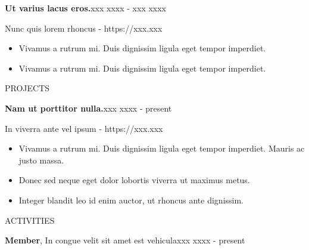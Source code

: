 \documentclass{article}
\newcommand{\itemSectionSpace}{\vspace{0.2in}}
\newcommand{\sectionSpace}{\vspace{0.3in}}
\begin{document}
\itemSectionSpace

\begin{minipage}[t]{0.125\linewidth}
\uppercase{}
\end{minipage}%
\hfill
\begin{minipage}[t]{0.85\linewidth}
\textbf{Ut varius lacus eros.}\hfill xxx xxxx - xxx xxxx

 Nunc quis lorem rhoncus - https://xxx.xxx

\begin{itemize}[noitemsep,topsep=0pt]
   \item Vivamus a rutrum mi. Duis dignissim ligula eget tempor imperdiet.
    \item Vivamus a rutrum mi. Duis dignissim ligula eget tempor imperdiet.
 \end{itemize}
\end{minipage}


\sectionSpace

\begin{minipage}[t]{0.125\linewidth}
\uppercase{Projects}
\end{minipage}%
\hfill
\begin{minipage}[t]{0.85\linewidth}
\textbf{Nam ut porttitor nulla.}\hfill xxx xxxx - present

In viverra ante vel ipsum - https://xxx.xxx

\begin{itemize}[noitemsep,topsep=0pt]
   \item Vivamus a rutrum mi. Duis dignissim ligula eget tempor imperdiet. Mauris ac justo massa.
   \item Donec sed neque eget dolor lobortis viverra ut maximus metus.
   \item  Integer blandit leo id enim auctor, ut rhoncus ante dignissim.
 \end{itemize}
\end{minipage}

\sectionSpace

\begin{minipage}[t]{0.125\linewidth}
\uppercase{ACTIVITIES}
\end{minipage}%
\hfill
\begin{minipage}[t]{0.85\linewidth}
\textbf{Member}, In congue velit sit amet est vehicula\hfill xxx xxxx - present
\end{minipage}
\end{document}

